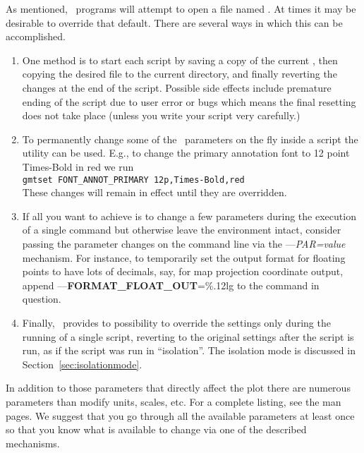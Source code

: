 As mentioned, \GMT\ programs will attempt to open a file named
.  At times it may be desirable to override
that default.  There are several ways in which this can be accomplished.
\begin{enumerate}
\item One method is to start each script by saving a
copy of the current , then copying the desired
 file to the current directory, and finally
reverting the changes at the end of the script.  Possible side effects
include premature ending of the script due to user error or bugs which
means the final resetting does not take place (unless you write your
script very carefully.)
\item To permanently change some of the \GMT\ parameters on the fly
inside a script the  utility can be used.  E.g., to
change the primary annotation font to 12 point Times-Bold in red we run \\

\texttt{gmtset FONT\_ANNOT\_PRIMARY 12p,Times-Bold,red} \\

These changes will remain in effect until they are overridden.
\item If all you want to achieve is to change a few parameters during
the execution of a single command but otherwise leave the environment intact, consider
passing the parameter changes on the command line via the {--}{--}\emph{PAR=value}
mechanism.  For instance, to temporarily set the output format for floating
points to have lots of decimals, say, for map projection coordinate output,
append {--}{--}\textbf{FORMAT\_FLOAT\_OUT}=\%.12lg to the command in question.
\item Finally, \GMT\ provides to possibility to override the
settings only  during the running of a single script, reverting to the original settings
after the script is run, as if the script was run in ``isolation''. The isolation mode
is discussed in Section~\ref{sec:isolationmode}.
\end{enumerate}
In addition to those parameters
that directly affect the plot there are numerous parameters than
modify units, scales, etc.  For a complete listing, see the
 man pages.  We suggest that you go through
all the available parameters at least once so that you know what is
available to change via one of the described mechanisms.


